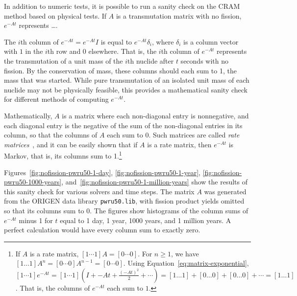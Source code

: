 In addition to numeric tests, it is possible to run a sanity check on the CRAM
method based on physical tests. If $A$ is a transmutation matrix with no
fission, $e^{-At}$ represents {\color{red}\ldots}.

The $i$th column of $e^{-At}=e^{-At}I$ is equal to $e^{-At}\delta_{i}$, where
$\delta_i$ is a column vector with $1$ in the $i$th row and $0$ elsewhere.
That is, the $i$th column of $e^{-At}$ represents the transmutation of a unit
mass of the $i$th nuclide after $t$ seconds with no fission. By the
conservation of mass, these columns should each sum to 1, the mass that was
started. While pure transmutation of an isolated unit mass of each nuclide may
not be physically feasible, this provides a mathematical sanity check for
different methods of computing $e^{-At}$.

Mathematically, $A$ is a matrix where each non-diagonal entry is nonnegative,
and each diagonal entry is the negative of the sum of the non-diagonal entries
in its column, so that the columns of $A$ each sum to $0$. Such matrices are
called \textit{rate matrices}~\cite{glasser1980properties}, and it can be
easily shown that if $A$ is a rate matrix, then $e^{-At}$ is Markov, that is,
its columns sum to 1.\footnote{If $A$ is a rate matrix,
$[1 \cdots 1] A = [0 \cdots 0]$. For $n\geq 1$, we have $[1 \ldots 1] A^n = [0 \cdots 0] A^{n-1} = [0\cdots 0]$. Using
Equation~\ref{eq:matrix-exponential},
$[1 \cdots 1]e^{-At} = [1 \cdots 1] (I + -At + \frac{(-At)^2}{2} + \cdots) =
[1\ldots 1] + [0 \ldots 0] + [0 \ldots 0] + \cdots = [1\ldots 1]$. That is,
the columns of $e^{-At}$ each sum to $1$.}

Figures~\ref{fig:nofission-pwru50-1-day}, \ref{fig:nofission-pwru50-1-year},
\ref{fig:nofission-pwru50-1000-years},
and~\ref{fig:nofission-pwru50-1-million-years} show the results of this sanity
check for various solvers and time steps. The matrix $A$ was generated from
the ORIGEN data library \texttt{pwru50.lib}, with fission product yields
omitted so that its columns sum to $0$. The figures show histograms of the
column sums of $e^{-At}$ minus 1 for $t$ equal to 1 day, 1 year, 1000 years,
and 1 million years. A perfect calculation would have every column sum to
exactly zero.


